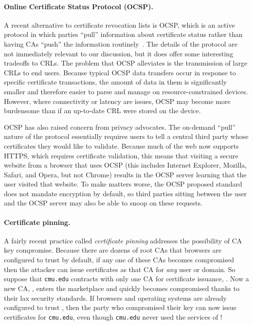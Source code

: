 \documentclass[11pt,twoside]{scrartcl}
\begin{document}
\paragraph{Online Certificate Status Protocol (OCSP).} A recent alternative to certificate revocation lists is OCSP, which is an active protocol in which parties ``pull'' information about certificate status rather than having CAs ``push'' the information routinely~\cite{ocsp}. The details of the protocol are not immediately relevant to our discussion, but it does offer some interesting tradeoffs to CRLs. The problem that OCSP alleviates is the transmission of large CRLs to end users. Because typical OCSP data transfers occur in response to specific certificate transactions, the amount of data in them is significantly smaller and therefore easier to parse and manage on resource-constrained devices. However, where connectivity or latency are issues, OCSP may become more burdensome than if an up-to-date CRL were stored on the device. 

OCSP has also raised concern from privacy advocates. The on-demand ``pull'' nature of the protocol essentially requires users to tell a central third party whose certificates they would like to validate. Because much of the web now supports HTTPS, which requires certificate validation, this means that visiting a secure website from a browser that uses OCSP (this includes Internet Explorer, Mozilla, Safari, and Opera, but not Chrome) results in the OCSP server learning that the user visited that website. To make matters worse, the OCSP proposed standard does not mandate encryption by default, so third parties sitting between the user and the OCSP server may also be able to snoop on these requests.

\paragraph{Certificate pinning.} A fairly recent practice called \emph{certificate pinning} addresses the possibility of CA key compromise. Because there are dozens of root CAs that browsers are configured to trust by default, if any one of these CAs becomes compromised then the attacker can issue certificates as that CA for \emph{any} user or domain. So suppose that \verb'cmu.edu' contracts with only one CA for certificate issuance, \tca. Now a new CA, \dca, enters the marketplace and quickly becomes compromised thanks to their lax security standards. If browsers and operating systems are already configured to trust \dca, then the party who compromised their key can now issue certificates for \verb'cmu.edu', even though \verb'cmu.edu' never used the services of \dca!
\end{document}
